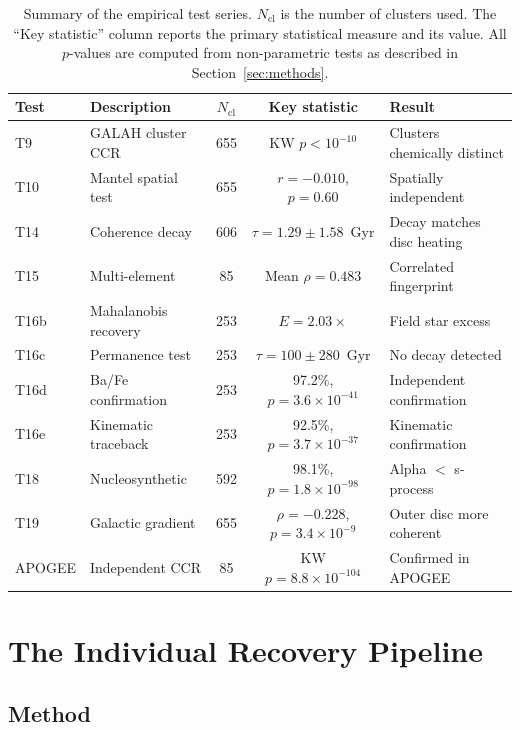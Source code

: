 \documentclass[fleqn,usenatbib]{mnras}
\begin{document}
\begin{table}
\centering
\caption{Summary of the empirical test series. $N_{\mathrm{cl}}$ is the number of clusters used. The ``Key statistic'' column reports the primary statistical measure and its value. All $p$-values are computed from non-parametric tests as described in Section~\ref{sec:methods}.}
\label{tab:summary}
\begin{tabular}{llccl}
\toprule
Test & Description & $N_{\mathrm{cl}}$ & Key statistic & Result \\
\midrule
T9  & GALAH cluster CCR    & 655 & KW $p < 10^{-10}$                 & Clusters chemically distinct \\
T10 & Mantel spatial test  & 655 & $r = -0.010$, $p = 0.60$           & Spatially independent \\
T14 & Coherence decay      & 606 & $\tau = 1.29 \pm 1.58$~Gyr         & Decay matches disc heating \\
T15 & Multi-element        &  85 & Mean $\rho = 0.483$                & Correlated fingerprint \\
T16b & Mahalanobis recovery & 253 & $E = 2.03\times$                  & Field star excess \\
T16c & Permanence test      & 253 & $\tau = 100 \pm 280$~Gyr           & No decay detected \\
T16d & Ba/Fe confirmation   & 253 & 97.2\%, $p = 3.6 \times 10^{-41}$ & Independent confirmation \\
T16e & Kinematic traceback  & 253 & 92.5\%, $p = 3.7 \times 10^{-37}$ & Kinematic confirmation \\
T18 & Nucleosynthetic      & 592 & 98.1\%, $p = 1.8 \times 10^{-98}$ & Alpha $<$ s-process \\
T19 & Galactic gradient    & 655 & $\rho = -0.228$, $p = 3.4 \times 10^{-9}$ & Outer disc more coherent \\
APOGEE & Independent CCR   &  85 & KW $p = 8.8 \times 10^{-104}$     & Confirmed in APOGEE \\
\bottomrule
\end{tabular}
\end{table}


\section{The Individual Recovery Pipeline}
\label{sec:pipeline}

\subsection{Method}
\end{document}
